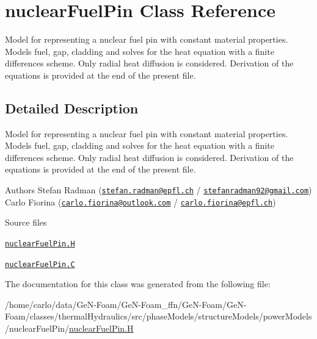 \hypertarget{classFoam_1_1thermoSubstructures_1_1nuclearFuelPin}{}\section{nuclear\+Fuel\+Pin Class Reference}
\label{classFoam_1_1thermoSubstructures_1_1nuclearFuelPin}


Model for representing a nuclear fuel pin with constant material properties. Models fuel, gap, cladding and solves for the heat equation with a finite differences scheme. Only radial heat diffusion is considered. Derivation of the equations is provided at the end of the present file.  




\subsection{Detailed Description}
Model for representing a nuclear fuel pin with constant material properties. Models fuel, gap, cladding and solves for the heat equation with a finite differences scheme. Only radial heat diffusion is considered. Derivation of the equations is provided at the end of the present file. 

\label{_Description}%
 Authors Stefan Radman (\href{mailto:stefan.radman@epfl.ch}{\tt stefan.\+radman@epfl.\+ch} / \href{mailto:stefanradman92@gmail.com}{\tt stefanradman92@gmail.\+com}) Carlo Fiorina (\href{mailto:carlo.fiorina@outlook.com}{\tt carlo.\+fiorina@outlook.\+com} / \href{mailto:carlo.fiorina@epfl.ch}{\tt carlo.\+fiorina@epfl.\+ch})

\begin{DoxyParagraph}{Source files}

\begin{DoxyItemize}
\item \href{../../../home/carlo/data/GeN-Foam/GeN-Foam_ffn/GeN-Foam/GeN-Foam/classes/thermalHydraulics/src/phaseModels/structureModels/powerModels/nuclearFuelPin/nuclearFuelPin.H}{\tt nuclear\+Fuel\+Pin.\+H} 
\item \href{../../../home/carlo/data/GeN-Foam/GeN-Foam_ffn/GeN-Foam/GeN-Foam/classes/thermalHydraulics/src/phaseModels/structureModels/powerModels/nuclearFuelPin/nuclearFuelPin.C}{\tt nuclear\+Fuel\+Pin.\+C} 
\end{DoxyItemize}
\end{DoxyParagraph}


The documentation for this class was generated from the following file\+:\begin{DoxyCompactItemize}
\item 
/home/carlo/data/\+Ge\+N-\/\+Foam/\+Ge\+N-\/\+Foam\+\_\+ffn/\+Ge\+N-\/\+Foam/\+Ge\+N-\/\+Foam/classes/thermal\+Hydraulics/src/phase\+Models/structure\+Models/power\+Models/nuclear\+Fuel\+Pin/\hyperlink{nuclearFuelPin_8H}{nuclear\+Fuel\+Pin.\+H}\end{DoxyCompactItemize}
